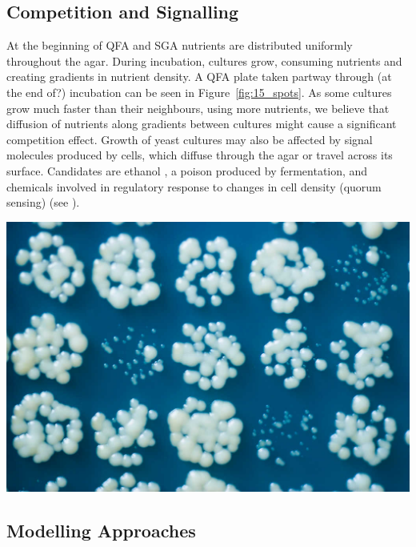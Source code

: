 \begin{multicols}{2}


\subsection{Competition and Signalling}

At the beginning of QFA and SGA nutrients are distributed uniformly throughout the
agar. During incubation, cultures grow, consuming nutrients and creating gradients in
nutrient density. A QFA plate taken partway through (at the end of?) incubation can be
seen in Figure~\ref{fig:15_spots}. As some cultures grow much faster than their
neighbours, using more nutrients, we believe that diffusion of nutrients along gradients
between cultures might cause a significant competition effect. Growth of yeast cultures
may also be affected by signal molecules produced by cells, which diffuse through the
agar or travel across its surface. Candidates are ethanol \citep{fujita2006}, a poison
produced by fermentation, and chemicals involved in regulatory response
to changes in cell density (quorum sensing) (see \citet{sprague2006,honigberg2011}).

\begin{Figure}
  \centering
  \includegraphics[width=\linewidth]{5658435523_c2e43729f1_b}
  \label{fig:15_spots}
\end{Figure}

\subsection{Modelling Approaches}


\end{multicols}
